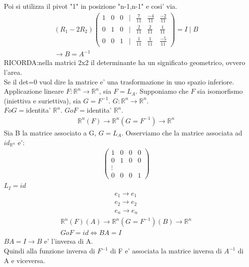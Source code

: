 \documentclass[a4paper,12pt]{article}
\begin{document}
Poi si utilizza il pivot "1" in posizione "n-1,n-1" e cosi' via.
\begin{align*}
    (R_1-2R_2)
    \begin{pmatrix}
        1&0&0&|&\frac{7}{11}&\frac{-4}{11}&\frac{-2}{11}\\
        0&1&0&|&\frac{2}{11}&\frac{2}{11}&\frac{1}{11}\\
        0&0&1&|&\frac{1}{11}&\frac{1}{11}&\frac{-5}{11}
    \end{pmatrix}=I\mid B 
    \\\to B=A^{-1}
\end{align*}
RICORDA:nella matrici 2x2 il determinante ha un significato geometrico, ovvero l'area.
\\Se il det=0 vuol dire la matrice e' una trasformazione in uno spazio inferiore.
\pagebreak
Applicazione lineare $F : \mathbb{R}^n \to \mathbb{R}^n$, sia $F=L_A$. Supponiamo che $F$ sia isomorfismo (iniettiva e suriettiva), sia $G=F^{-1}$.
$G : \mathbb{R}^n \to \mathbb{R}^n $. \\$FoG=$identita' $\mathbb{R}^n$. $GoF=$identita' $\mathbb{R}^n$.
\begin{align*}
    \mathbb{R}^n (F)\to \mathbb{R}^n (G=F^{-1})\to \mathbb{R}^n 
\end{align*}
Sia B la matrice associato a G, $G=L_A$. Osserviamo che la matrice associata ad $id_{\mathbb{R}^n}$ e':
\begin{align*}
    \begin{pmatrix}
        1&0&0&0\\0&1&0&0\\\vdots\\0&0&0&1
    \end{pmatrix}
\end{align*}
$L_I=id$
\begin{align*}
    e_1 \to e_1 \\
    e_2 \to e_2 \\
    e_n \to e_n
\end{align*}
\begin{align*}
    \mathbb{R}^n (F)(A)\to \mathbb{R}^n (G=F^{-1})(B)\to \mathbb{R}^n 
    \\GoF=id \iff BA=I
\end{align*}
$BA=I \to B$ e' l'inversa di A.
\\Quindi alla funzione inversa di $F^{-1}$ di F e' associata la matrice inversa di $A^{-1}$ di A e viceversa.
\end{document}
